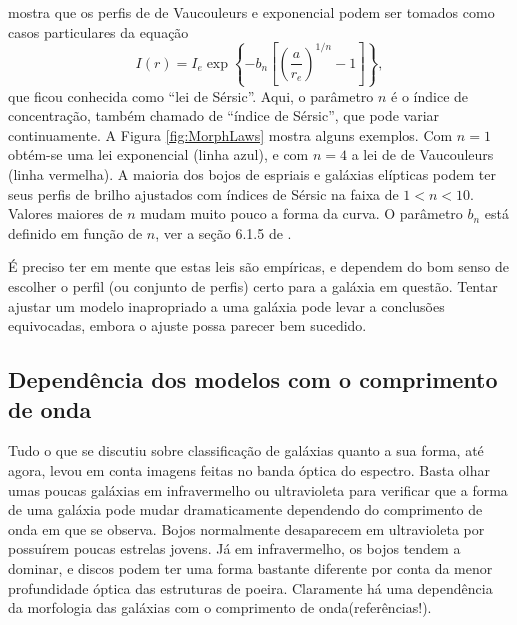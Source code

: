 \citet{Sersic1963} mostra que os perfis de de Vaucouleurs e exponencial podem
ser tomados como casos particulares da equação
\begin{equation*}
I(r) = I_e \exp \left\{- b_n \left[ \left( \frac{a}{r_e} \right)^{1/n}
- 1 \right] \right\},
\end{equation*}
que ficou conhecida como ``lei de Sérsic''. Aqui, o parâmetro $n$ é o índice de
concentração, também chamado de ``índice de Sérsic'', que pode variar
continuamente. A Figura \ref{fig:MorphLaws} mostra alguns exemplos. Com
$n\!=\!1$ obtém-se uma lei exponencial (linha azul), e com $n\!=\!4$ a lei de de
Vaucouleurs (linha vermelha). A maioria dos bojos de espriais e galáxias
elípticas podem ter seus perfis de brilho ajustados com índices de Sérsic na
faixa de $1 < n < 10$. Valores maiores de $n$ mudam muito pouco a forma da
curva. O parâmetro $b_n$ está definido em função de $n$, ver a seção 6.1.5 de
\citet{Erwin2015}.

É preciso ter em mente que estas leis são empíricas, e dependem do bom senso de
escolher o perfil (ou conjunto de perfis) certo para a galáxia em questão.
Tentar ajustar um modelo inapropriado a uma galáxia pode levar a conclusões
equivocadas, embora o ajuste possa parecer bem sucedido.


\subsection{Dependência dos modelos com o comprimento de onda}
\label{sec:morph:comp:depLambda}

Tudo o que se discutiu sobre classificação de galáxias quanto a sua forma, até
agora, levou em conta imagens feitas no banda óptica do espectro. Basta olhar
umas poucas galáxias em infravermelho ou ultravioleta para verificar que a forma
de uma galáxia pode mudar dramaticamente dependendo do comprimento de onda em
que se observa. Bojos normalmente desaparecem em ultravioleta por possuírem
poucas estrelas jovens. Já em infravermelho, os bojos tendem a dominar, e discos
podem ter uma forma bastante diferente por conta da menor profundidade óptica
das estruturas de poeira. Claramente há uma dependência da morfologia das
galáxias com o comprimento de onda\fixme(referências!).

